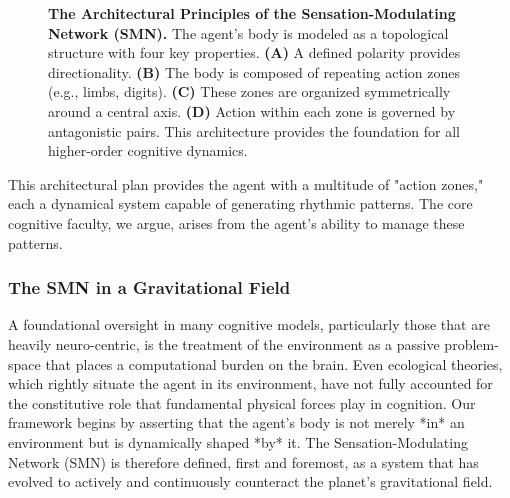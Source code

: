 \begin{figure}[ht]
    \centering
    \caption{\textbf{The Architectural Principles of the Sensation-Modulating Network (SMN).} The agent's body is modeled as a topological structure with four key properties. \textbf{(A)} A defined polarity provides directionality. \textbf{(B)} The body is composed of repeating action zones (e.g., limbs, digits). \textbf{(C)} These zones are organized symmetrically around a central axis. \textbf{(D)} Action within each zone is governed by antagonistic pairs. This architecture provides the foundation for all higher-order cognitive dynamics.}
    \label{fig:smn_architecture}
\end{figure}

This architectural plan provides the agent with a multitude of "action zones," each a dynamical system capable of generating rhythmic patterns. The core cognitive faculty, we argue, arises from the agent's ability to manage these patterns.


\subsubsection{The SMN in a Gravitational Field}
\label{ssubsec:gravity}
A foundational oversight in many cognitive models, particularly those that are heavily neuro-centric, is the treatment of the environment as a passive problem-space that places a computational burden on the brain. Even ecological theories, which rightly situate the agent in its environment, have not fully accounted for the constitutive role that fundamental physical forces play in cognition. Our framework begins by asserting that the agent’s body is not merely *in* an environment but is dynamically shaped *by* it. The Sensation-Modulating Network (SMN) is therefore defined, first and foremost, as a system that has evolved to actively and continuously counteract the planet's gravitational field.

